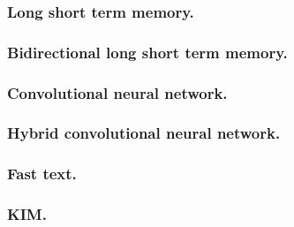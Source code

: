 \subsubsection{Long short term memory.}
\subsubsection{Bidirectional long short term memory.}
\subsubsection{Convolutional neural network.}
\subsubsection{Hybrid convolutional neural network.}
\subsubsection{Fast text.}
\subsubsection{KIM.}
